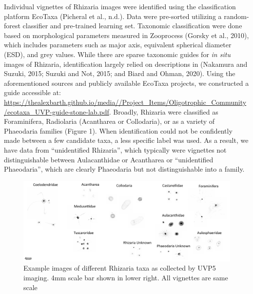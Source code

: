 \documentclass[
]{article}
\begin{document}
Individual vignettes of Rhizaria images were identified using the
classification platform EcoTaxa (Picheral et al., n.d.). Data were
pre-sorted utilizing a random-forest classifier and pre-trained learning
set. Taxonomic classification were done based on morphological
parameters measured in Zooprocess (Gorsky et al., 2010), which includes
parameters such as major axis, equivalent spherical diameter (ESD), and
grey values. While there are sparse taxonomic guides for \emph{in situ}
images of Rhizaria, identification largely relied on descriptions in
(Nakamura and Suzuki, 2015; Suzuki and Not, 2015; and Biard and Ohman,
2020). Using the aforementioned sources and publicly available EcoTaxa
projects, we constructed a guide accessible at:
\url{https://thealexbarth.github.io/media//Project_Items/Oligotrophic_Community/ecotaxa_UVP-guide-stone-lab.pdf}.
Broadly, Rhizaria were classified as Foraminifera, Radiolaria
(Acantharea or Collodaria), or as a variety of Phaeodaria families
(Figure 1). When identification could not be confidently made between a
few candidate taxa, a less specific label was used. As a result, we have
data from ``unidentified Rhizaria'', which typically were vignettes not
distinguishable between Aulacanthidae or Acantharea or ``unidentified
Phaeodaria'', which are clearly Phaeodaria but not distinguishable into
a family.

\begin{figure}[H]

{\centering \includegraphics{images/01_taxa.pdf}

}

\caption{Example images of different Rhizaria taxa as collected by UVP5
imaging. 4mm scale bar shown in lower right. All vignettes are same
scale}

\end{figure}%
\end{document}
